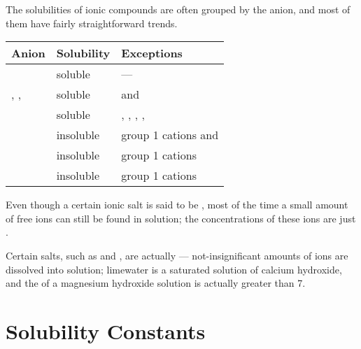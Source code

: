 			The solubilities of ionic compounds are often grouped by the anion, and most of them have fairly straightforward trends.

			\begin{table}[htb]\renewcommand{\arraystretch}{1.5}\begin{center}
			\begin{tabu} to 0.9\textwidth { X[c,m] | X[c,m] | X[c,m] }

				Anion                           &   Solubility  &   Exceptions                                                  \\ \hline
				                       &   soluble     &   ---                                                         \\
				\ch{\Cl-}, ,     &   soluble     &    and                                      \\
				                     &   soluble     &   , , , ,     \\
				                     &   insoluble   &   group 1 cations and               \\
				                        &   insoluble   &   group 1 cations                            \\
				                       &   insoluble   &   group 1 cations                            \\

			\end{tabu}\end{center}
			\end{table}\vspace{-1em}


			Even though a certain ionic salt is said to be , most of the time a small amount of free ions can still be found
			in solution; the concentrations of these ions are just .

			Certain salts, such as  and , are actually  --- not-insignificant amounts of ions
			are dissolved into solution; limewater is a saturated solution of calcium hydroxide, and the \pH{} of a magnesium hydroxide solution
			is actually greater than 7.




	\pagebreak
	\section{Solubility Constants}

